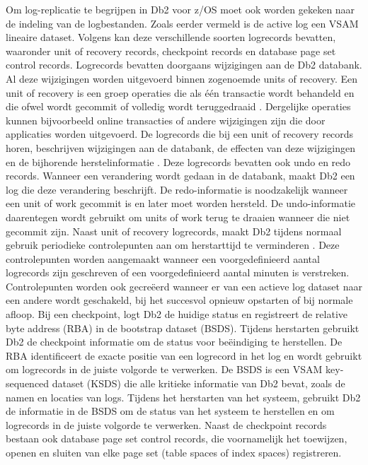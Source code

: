 Om log-replicatie te begrijpen in Db2 voor z/OS moet ook worden gekeken naar de indeling van de logbestanden.
Zoals eerder vermeld is de active log een VSAM lineaire dataset.
Volgens \textcite{ibm_2026_db2_log_content} kan deze verschillende soorten logrecords bevatten, waaronder unit of recovery records, checkpoint records en database page set control records.
Logrecords bevatten doorgaans wijzigingen aan de Db2 databank.
Al deze wijzigingen worden uitgevoerd binnen zogenoemde units of recovery. 
Een unit of recovery is een groep operaties die als één transactie wordt behandeld en die ofwel wordt gecommit of volledig wordt teruggedraaid \autocite{ibm_2025_infosphere_units_recovery}.
Dergelijke operaties kunnen bijvoorbeeld online transacties of andere wijzigingen zijn die door applicaties worden uitgevoerd.
De logrecords die bij een unit of recovery records horen, beschrijven wijzigingen aan de databank, de effecten van deze wijzigingen en de bijhorende herstelinformatie \autocite{ibm_2026_db2_13}.
Deze logrecords bevatten ook undo en redo records.
Wanneer een verandering wordt gedaan in de databank, maakt Db2 een log die deze verandering beschrijft.
De redo-informatie is noodzakelijk wanneer een unit of work gecommit is en later moet worden hersteld.
De undo-informatie daarentegen wordt gebruikt om units of work terug te draaien wanneer die niet gecommit zijn.
Naast unit of recovery logrecords, maakt Db2 tijdens normaal gebruik periodieke controlepunten aan om herstarttijd te verminderen \autocite{ibm_2026_db2_checkpoint_records}.
Deze controlepunten worden aangemaakt wanneer een voorgedefinieerd aantal logrecords zijn geschreven of een voorgedefinieerd aantal minuten is verstreken.
Controlepunten worden ook gecreëerd wanneer er van een actieve log dataset naar een andere wordt geschakeld, bij het succesvol opnieuw opstarten of bij normale afloop.
Bij een checkpoint, logt Db2 de huidige status en registreert de relative byte address (RBA) in de bootstrap dataset (BSDS). 
Tijdens herstarten gebruikt Db2 de checkpoint informatie om de status voor beëindiging te herstellen.
De RBA identificeert de exacte positie van een logrecord in het log en wordt gebruikt om logrecords in de juiste volgorde te verwerken.
De BSDS is een VSAM key-sequenced dataset (KSDS) die alle kritieke informatie van Db2 bevat, zoals de namen en locaties van logs. 
Tijdens het herstarten van het systeem, gebruikt Db2 de informatie in de BSDS om de status van het systeem te herstellen en om logrecords in de juiste volgorde te verwerken. 
Naast de checkpoint records bestaan ook database page set control records, die voornamelijk het toewijzen, openen en sluiten van elke page set (table spaces of index spaces) registreren.

